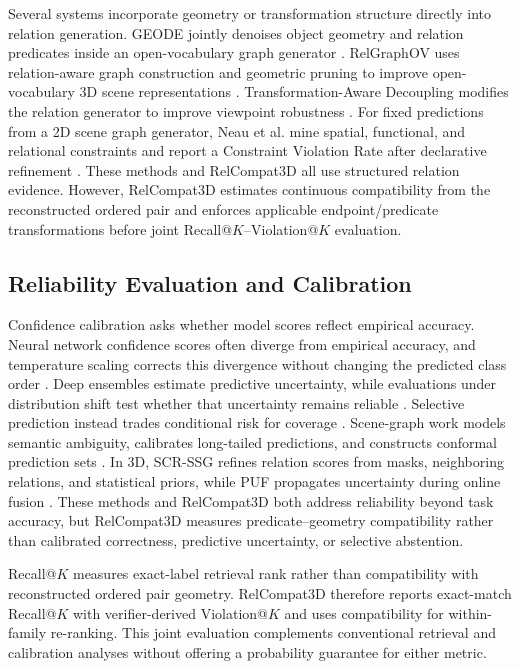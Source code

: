 Several systems incorporate geometry or transformation structure directly into relation generation. GEODE jointly denoises object geometry and relation predicates inside an open-vocabulary graph generator \cite{feng2026geode}. RelGraphOV uses relation-aware graph construction and geometric pruning to improve open-vocabulary 3D scene representations \cite{chen2026beyond}. Transformation-Aware Decoupling modifies the relation generator to improve viewpoint robustness \cite{sun2026not}. For fixed predictions from a 2D scene graph generator, Neau et al. mine spatial, functional, and relational constraints and report a Constraint Violation Rate after declarative refinement \cite{neau2026visual}. These methods and RelCompat3D all use structured relation evidence. However, RelCompat3D estimates continuous compatibility from the reconstructed ordered pair and enforces applicable endpoint/predicate transformations before joint Recall@$K$--Violation@$K$ evaluation. 

\subsection{Reliability Evaluation and Calibration}
Confidence calibration asks whether model scores reflect empirical accuracy. Neural network confidence scores often diverge from empirical accuracy, and temperature scaling corrects this divergence without changing the predicted class order \cite{guo2017calibration}. Deep ensembles estimate predictive uncertainty, while evaluations under distribution shift test whether that uncertainty remains reliable \cite{lakshminarayanan2017simple,ovadia2019can}. Selective prediction instead trades conditional risk for coverage \cite{geifman2017selective}. Scene-graph work models semantic ambiguity, calibrates long-tailed predictions, and constructs conformal prediction sets \cite{yang2021probabilistic,zhu2024calibration,nag2025conformal}. In 3D, SCR-SSG refines relation scores from masks, neighboring relations, and statistical priors, while PUF propagates uncertainty during online fusion \cite{yeo2025statistical,yang2026puf}. These methods and RelCompat3D both address reliability beyond task accuracy, but RelCompat3D measures predicate--geometry compatibility rather than calibrated correctness, predictive uncertainty, or selective abstention.

Recall@$K$ measures exact-label retrieval rank rather than compatibility with reconstructed ordered pair geometry. RelCompat3D therefore reports exact-match Recall@$K$ with verifier-derived Violation@$K$ and uses compatibility for within-family re-ranking. This joint evaluation complements conventional retrieval and calibration analyses without offering a probability guarantee for either metric.


